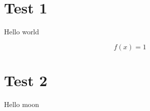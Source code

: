 \section{Test 1}
\label{sec:1}

Hello world

\begin{equation}
  f(x) = 1
  \label{eq:1}
\end{equation}

\section{Test 2}
\label{sec:2}

Hello moon


